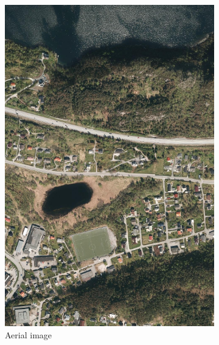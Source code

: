 \begin{figure}
\begin{subfigure}{0.32\textwidth}
\includegraphics[width=\linewidth]{figs/datasets/Norwegian_roads_data_example2.png}
\caption{Aerial image} \label{fig:norwegian_roads_example_data}
\end{subfigure}
\hspace*{\fill} %
\begin{subfigure}{0.32\textwidth}

\end{subfigure}
\end{figure}

